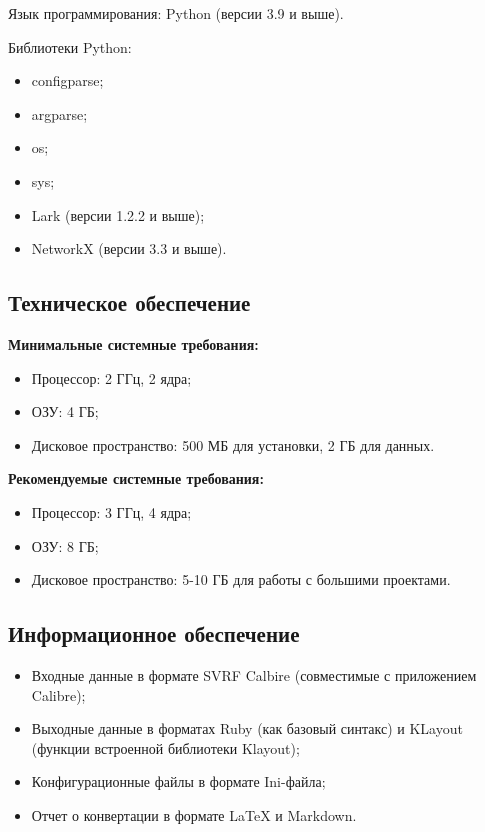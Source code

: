 Язык программирования: Python (версии 3.9 и выше).

Библиотеки Python:

\begin{itemize}
	\item configparse;
	\item argparse;
	\item os;
	\item sys;
	\item Lark (версии 1.2.2 и выше);
	\item NetworkX (версии 3.3 и выше).
\end{itemize}

\subsection{Техническое обеспечение}

\textbf{Минимальные системные требования:}

\begin{itemize}
	\item Процессор: 2 ГГц, 2 ядра;
	\item ОЗУ: 4 ГБ;
	\item Дисковое пространство: 500 МБ для установки, 2 ГБ для данных.
\end{itemize}

\textbf{Рекомендуемые системные требования:}

\begin{itemize}
	\item Процессор: 3 ГГц, 4 ядра;
	\item ОЗУ: 8 ГБ;
	\item Дисковое пространство: 5-10 ГБ для работы с большими проектами.
\end{itemize}

\subsection{Информационное обеспечение}

\begin{itemize}
	\item Входные данные в формате SVRF Calbire
		(совместимые с приложением Calibre);
	\item Выходные данные в форматах Ruby (как базовый синтакс)
		и KLayout (функции встроенной библиотеки Klayout);
	\item Конфигурационные файлы в формате Ini-файла;
	\item Отчет о конвертации в формате LaTeX и Markdown.
\end{itemize}

